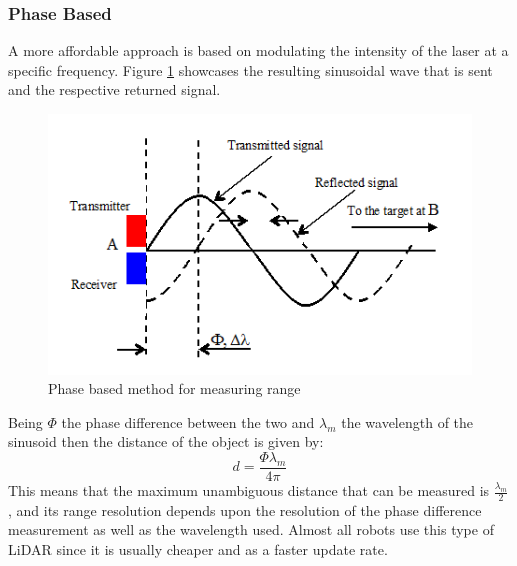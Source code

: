 \subsubsection{Phase Based}
A more affordable approach  is based on modulating the intensity of the laser at a specific frequency. Figure \ref{fig:cwlidar1} showcases the resulting sinusoidal wave that is sent and the respective returned signal. 
\begin{figure}[h] 
\centerline{\includegraphics [width=0.7 \textwidth]{imgs/chapter2/cwlidar1.png}}
\caption{Phase based method for measuring range \cite{cwlidar}}
\label{fig:cwlidar1}
\end{figure}

Being $\Phi$ the phase difference between the two and $\lambda_m$ the wavelength of the sinusoid then the distance of the object is given by:
\begin{equation}
    d=\frac{\Phi \lambda_m}{4 \pi}
\end{equation}
This means that the maximum unambiguous distance that can be measured is  $\frac{\lambda_m}{2}$, and its range resolution depends upon the resolution of the phase difference measurement as well as the wavelength used. Almost all robots use this type of \ac{LiDAR} since it is usually cheaper and as a faster update rate.

